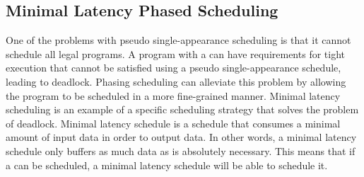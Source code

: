 \begin{comment}
One important observation to make is that it makes little sense to
have phases which do not consume or produce any data, and which do
not have data cross any latency boundaries.  This is because such
phases can easily be merged with preceding or following phases
without any effect on ability to schedule a particular program.
This observation allows to easily bound the size of the resulting
schedules to be the sum of executions of first child, last child
and children with latency boundaries. For example, the {\pipeline}
in Figure \ref{fig:hierarchical-schedule} executes its first
child, {\filter} A, 4 times in steady state execution, and its last
child, {\filter} D, 9 times. Thus a phasing schedule of this
pipeline should at most have $4+9=13$ phases.
\end{comment}

\subsection{Minimal Latency Phased Scheduling}
\label{sec:min-latency}

One of the problems with pseudo single-appearance scheduling is
that it cannot schedule all legal {\StreamIt} programs.  A program
with a {{\feedbackloop}} can have requirements for tight execution
that cannot be satisfied using a pseudo single-appearance
schedule, leading to deadlock. Phasing scheduling can alleviate
this problem by allowing the program to be scheduled in a more
fine-grained manner. Minimal latency scheduling is an example of a
specific scheduling strategy that solves the problem of deadlock.
Minimal latency schedule is a schedule that consumes a minimal
amount of input data in order to output data. In other words, a
minimal latency schedule only buffers as much data as is
absolutely necessary. This means that if a {\feedbackloop} can be
scheduled, a minimal latency schedule will be able to schedule it.

